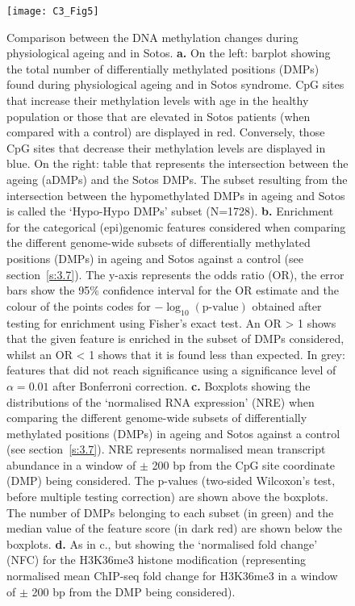 \begin{figure}[htbp!] 
	\centering    
	\texttt{[image: C3\_Fig5]}
	\caption[Comparing DNA methylation changes in Sotos syndrome and physiological ageing]{Comparison between the DNA methylation changes during physiological ageing and in Sotos. \textbf{a.} On the left: barplot showing the total number of differentially methylated positions (DMPs) found during physiological ageing and in Sotos syndrome. CpG sites that increase their methylation levels with age in the healthy population or those that are elevated in Sotos patients (when compared with a control) are displayed in red. Conversely, those CpG sites that decrease their methylation levels are displayed in blue. On the right: table that represents the intersection between the ageing (aDMPs) and the Sotos DMPs. The subset resulting from the intersection between the hypomethylated DMPs in ageing and Sotos is called the `Hypo-Hypo DMPs’ subset (N=1728). \textbf{b.} Enrichment for the categorical (epi)genomic features considered when comparing the different genome-wide subsets of differentially methylated positions (DMPs) in ageing and Sotos against a control (see section~\ref{s:3.7}). The y-axis represents the odds ratio (\acrshort{OR}), the error bars show the 95\% confidence interval for the OR estimate and the colour of the points codes for $-\log_{10}(\text{p-value})$ obtained after testing for enrichment using Fisher's exact test. An OR > 1 shows that the given feature is enriched in the subset of DMPs considered, whilst an OR < 1 shows that it is found less than expected. In grey: features that did not reach significance using a significance level of $\alpha = 0.01$ after Bonferroni correction. \textbf{c.} Boxplots showing the distributions of the `normalised RNA expression' (\acrshort{NRE}) when comparing the different genome-wide subsets of differentially methylated positions (DMPs) in ageing and Sotos against a control (see section~\ref{s:3.7}). NRE represents normalised mean transcript abundance in a window of $\pm$ 200 bp from the CpG site coordinate (DMP) being considered. The p-values (two-sided Wilcoxon's test, before multiple testing correction) are shown above the boxplots. The number of DMPs belonging to each subset (in green) and the median value of the feature score (in dark red) are shown below the boxplots. \textbf{d.} As in c., but showing the `normalised fold change' (\acrshort{NFC}) for the H3K36me3 histone modification (representing normalised mean ChIP-seq fold change for H3K36me3 in a window of $\pm$ 200 bp from the DMP being considered).}
	\label{fig:c3_fig5}
\end{figure}


